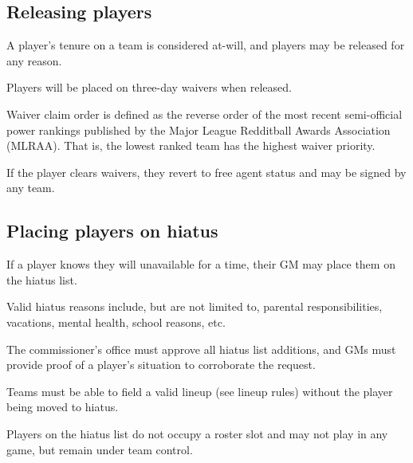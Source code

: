 \subsection{Releasing players}
\begin{deepEnumerate}
      \item A player's tenure on a team is considered at-will, 
            and players may be released for any reason.
      \item Players will be placed on three-day waivers when released.
            \begin{deepEnumerate}
                  \item Waiver claim order is defined as the reverse order 
                        of the most recent semi-official power rankings 
                        published by the Major League Redditball Awards Association (MLRAA).
                        That is, the lowest ranked team has the highest waiver priority.
                  \item If the player clears waivers, 
                        they revert to free agent status and may be signed by any team.
            \end{deepEnumerate}
\end{deepEnumerate}

\subsection{Placing players on hiatus}
\begin{deepEnumerate}
      \item If a player knows they will unavailable for a time,
            their GM may place them on the hiatus list.
            \begin{deepEnumerate}
                  \item Valid hiatus reasons include, but are not limited to,
                        parental responsibilities, vacations, mental health, school reasons, etc.
                  \item The commissioner’s office must approve all hiatus list additions,
                        and GMs must provide proof of a player's situation to corroborate the request.
                  \item Teams must be able to field a valid lineup (see lineup rules) %
                        without the player being moved to hiatus.
            \end{deepEnumerate}
      \item Players on the hiatus list do not occupy a roster slot
            and may not play in any game,
            but remain under team control.
\end{deepEnumerate}

